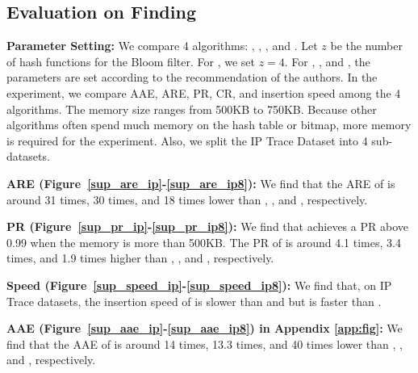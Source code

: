 





\subsection{Evaluation on Finding \tasktwo} %
\label{eva_two}

\noindent\textbf{Parameter Setting:}
%
%
%
We compare 4 algorithms: \sketchname, \supolf\cite{superspreader}, \suptlf\cite{superspreader}, and \supopen\cite{opensketch}.
Let $z$ be the number of hash functions for the Bloom filter. For \sketchname{}, we set $z=4$.
For \supolf, \suptlf{}, and \supopen, the parameters are set according to the recommendation of the authors.
In the experiment, we compare AAE, ARE, PR, CR, and insertion speed among the 4 algorithms.
The memory size ranges from 500KB to 750KB. Because other algorithms often spend much memory on the hash table or bitmap, more memory is required for the experiment. Also, we split the IP Trace Dataset into 4 sub-datasets.
			

\noindent\textbf{ARE (Figure~\ref{sup_are_ip}-\ref{sup_are_ip8}):}
We find that the ARE of \sketchname{} is around 31 times, 30 times, and 18 times lower than \supolf, \suptlf{}, and \supopen{}, respectively.
			
\noindent\textbf{PR (Figure~\ref{sup_pr_ip}-\ref{sup_pr_ip8}):}
We find that \sketchname{} achieves a PR above 0.99 when the memory is more than 500KB. The PR of \sketchname{} is around 4.1 times, 3.4 times, and 1.9 times higher than \supolf, \suptlf{}, and \supopen{}, respectively.
			
			
\noindent\textbf{Speed (Figure~\ref{sup_speed_ip}-\ref{sup_speed_ip8}):}
We find that, on IP Trace datasets, the insertion speed of \sketchname{} is slower than \supolf{} and \suptlf{} but is faster than \supopen{}.

\noindent\textbf{AAE (Figure~\ref{sup_aae_ip}-\ref{sup_aae_ip8}) in Appendix \ref{app:fig}:}
We find that the AAE of \sketchname{} is around 14 times, 13.3 times, and 40 times lower than \supolf, \suptlf{}, and \supopen{}, respectively.

